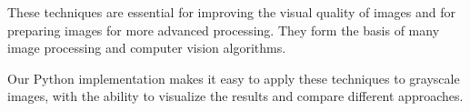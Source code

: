 \documentclass[12pt,a4paper]{article}
\begin{document}
These techniques are essential for improving the visual quality of images and for preparing images for more advanced processing. They form the basis of many image processing and computer vision algorithms.

Our Python implementation makes it easy to apply these techniques to grayscale images, with the ability to visualize the results and compare different approaches.
\end{document}
